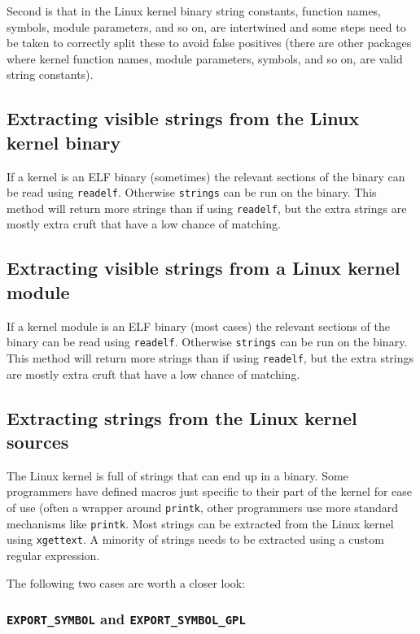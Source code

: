 \documentclass[10pt,a4paper]{article}
\begin{document}
Second is that in the Linux kernel binary string constants, function names,
symbols, module parameters, and so on, are intertwined and some steps need to
be taken to correctly split these to avoid false positives (there are other
packages where kernel function names, module parameters, symbols, and so on,
are valid string constants).

\subsection{Extracting visible strings from the Linux kernel binary}

If a kernel is an ELF binary (sometimes) the relevant sections of the
binary can be read using \texttt{readelf}. Otherwise \texttt{strings} can be
run on the binary. This method will return more strings than if using
\texttt{readelf}, but the extra strings are mostly extra cruft that have a low
chance of matching.

\subsection{Extracting visible strings from a Linux kernel module}

If a kernel module is an ELF binary (most cases) the relevant sections of the
binary can be read using \texttt{readelf}. Otherwise \texttt{strings} can be
run on the binary. This method will return more strings than if using
\texttt{readelf}, but the extra strings are mostly extra cruft that have a low
chance of matching.

\subsection{Extracting strings from the Linux kernel sources}

The Linux kernel is full of strings that can end up in a binary. Some
programmers have defined macros just specific to their part of the kernel for
ease of use (often a wrapper around \texttt{printk}, other programmers use
more standard mechanisms like \texttt{printk}. Most strings can be extracted
from the Linux kernel using \texttt{xgettext}. A minority of strings needs to
be extracted using a custom regular expression.

The following two cases are worth a closer look:

\subsubsection{\texttt{EXPORT\_SYMBOL} and \texttt{EXPORT\_SYMBOL\_GPL}}
\end{document}
